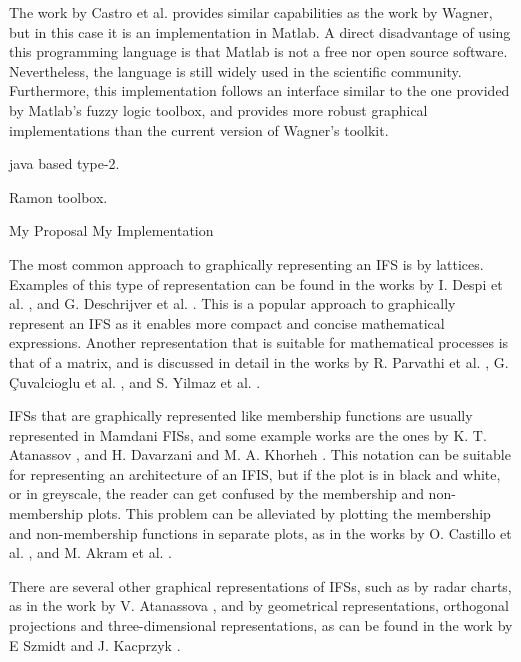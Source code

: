The work by Castro et al. \cite{castro2007interval} provides similar
capabilities as the work by Wagner, but in this case it is an implementation in
Matlab. A direct disadvantage of using this programming language is that Matlab
is not a free nor open source software.  Nevertheless, the language is still
widely used in the scientific community. Furthermore, this implementation
follows an interface similar to the one provided by Matlab's fuzzy logic
toolbox, and provides more robust graphical implementations than the current
version of Wagner's toolkit.

\cite{Wagner2013} java based type-2.

\cite{castro2007interval} Ramon toolbox.

\cite{Hernandez-aguila2016} My Proposal \cite{Hernandez-Aguila2017} My
Implementation


The most common approach to graphically representing an IFS is by
lattices. Examples of this type of representation can be found in the works by
I. Despi et al. \cite{Despi2013}, and G. Deschrijver et
al. \cite{Deschrijver2004}. This is a popular approach to graphically represent
an IFS as it enables more compact and concise mathematical expressions. Another
representation that is suitable for mathematical processes is that of a matrix,
and is discussed in detail in the works by R. Parvathi et
al. \cite{Parvathi2014}, G. Çuvalcioglu et al. \cite{Yilmaz2015}, and S. Yilmaz
et al. \cite{Yilmaz2015a}.

IFSs that are graphically represented like membership functions are usually
represented in Mamdani FISs, and some example works are the ones by
K. T. Atanassov \cite{Atanassov1986}, and H. Davarzani and M. A. Khorheh
\cite{Davarzani2013}. This notation can be suitable for representing an
architecture of an IFIS, but if the plot is in black and white, or in greyscale,
the reader can get confused by the membership and non-membership plots. This
problem can be alleviated by plotting the membership and non-membership
functions in separate plots, as in the works by O. Castillo et
al. \cite{castillo2007intuitionistic}, and M. Akram et al. \cite{Akram2014}.

There are several other graphical representations of IFSs, such as by radar
charts, as in the work by V. Atanassova \cite{Atanassova2010}, and by
geometrical representations, orthogonal projections and three-dimensional
representations, as can be found in the work by E Szmidt and J. Kacprzyk
\cite{Szmidt2000}.

